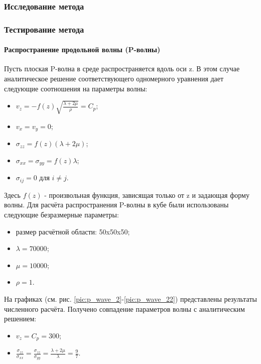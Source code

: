 \clearpage
\newpage

\subsubsection{Исследование метода}


\clearpage
\newpage

\subsubsection{Тестирование метода}

\paragraph{Распространение продольной волны (P-волны)}
Пусть плоская P-волна в среде распространяется вдоль оси z. В этом случае аналитическое решение соответствующего одномерного уравнения дает следующие соотношения на параметры волны:
\begin{itemize}
\item $v_z=-f(z)\sqrt{\frac{\lambda+2\mu}{\rho}}=C_p$;
\item $v_x=v_y=0$;
\item $\sigma_{zz}=f(z)(\lambda+2\mu)$;
\item $\sigma_{xx}=\sigma_{yy}=f(z)\lambda$;
\item $\sigma_{ij}=0$ для $i \neq j$.
\end{itemize}
Здесь $f(z)$ - произвольная функция, зависящая только от z и задающая форму волны.
Для расчёта распространения P-волны в кубе были использованы следующие безразмерные параметры: 
\begin{itemize}
\item размер расчётной области: 50x50x50;
\item $\lambda=70000$;
\item $\mu=10000$;
\item $\rho=1$.
\end{itemize}
На графиках (см. рис.
\ref{pic:p_wave_2}-\ref{pic:p_wave_22}) представлены результаты численного расчёта. Получено совпадение параметров волны с аналитическим решением:
\begin{itemize}
\item $v_z=C_p=300$;
\item $\frac{\sigma_{zz}}{\sigma_{xx}}=\frac{\sigma_{zz}}{\sigma_{yy}}=\frac{\lambda+2\mu}{\lambda}=\frac{9}{7}$.
\end{itemize}

